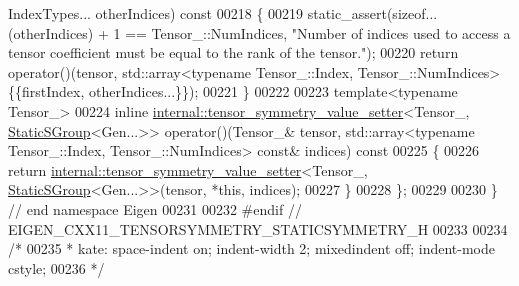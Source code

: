 \begin{DoxyCode}
      IndexTypes... otherIndices)\textcolor{keyword}{ const}
00218 \textcolor{keyword}{    }\{
00219       static\_assert(\textcolor{keyword}{sizeof}...(otherIndices) + 1 == Tensor\_::NumIndices, \textcolor{stringliteral}{"Number of indices used to access a
       tensor coefficient must be equal to the rank of the tensor."});
00220       \textcolor{keywordflow}{return} operator()(tensor, std::array<typename Tensor\_::Index, Tensor\_::NumIndices>\{\{firstIndex, 
      otherIndices...\}\});
00221     \}
00222 
00223     \textcolor{keyword}{template}<\textcolor{keyword}{typename} Tensor\_>
00224     \textcolor{keyword}{inline} \hyperlink{class_eigen_1_1internal_1_1tensor__symmetry__value__setter}{internal::tensor\_symmetry\_value\_setter}<Tensor\_, 
      \hyperlink{class_eigen_1_1_static_s_group}{StaticSGroup}<Gen...>> operator()(Tensor\_& tensor, std::array<typename Tensor\_::Index,
       Tensor\_::NumIndices> \textcolor{keyword}{const}& indices)\textcolor{keyword}{ const}
00225 \textcolor{keyword}{    }\{
00226       \textcolor{keywordflow}{return} \hyperlink{class_eigen_1_1internal_1_1tensor__symmetry__value__setter}{internal::tensor\_symmetry\_value\_setter}<Tensor\_, 
      \hyperlink{class_eigen_1_1_static_s_group}{StaticSGroup}<Gen...>>(tensor, *\textcolor{keyword}{this}, indices);
00227     \}
00228 \};
00229 
00230 \} \textcolor{comment}{// end namespace Eigen}
00231 
00232 \textcolor{preprocessor}{#endif // EIGEN\_CXX11\_TENSORSYMMETRY\_STATICSYMMETRY\_H}
00233 
00234 \textcolor{comment}{/*}
00235 \textcolor{comment}{ * kate: space-indent on; indent-width 2; mixedindent off; indent-mode cstyle;}
00236 \textcolor{comment}{ */}
\end{DoxyCode}
